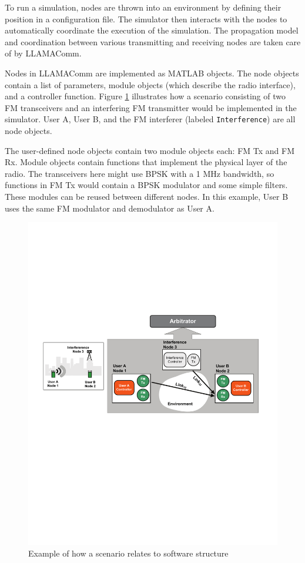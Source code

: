 To run a simulation, nodes are thrown into an environment by
defining their position in a configuration file.  The simulator then
interacts with the nodes to automatically coordinate the execution
of the simulation.  The propagation model and coordination between
various transmitting and receiving nodes are taken care of by
LLAMAComm.

Nodes in LLAMAComm are implemented as MATLAB objects.  The node
objects contain a list of parameters, module objects (which describe
the radio interface), and a controller function. Figure
\ref{fig:softwareOverview} illustrates how a scenario consisting of
two FM transceivers and an interfering FM transmitter would be
implemented in the simulator. User A, User B, and the FM interferer
(labeled \verb+Interference+) are all node objects.

The user-defined node objects contain two module objects each: FM Tx
and FM Rx.  Module objects contain functions that implement the
physical layer of the radio.  The transceivers here might use BPSK
with a 1 MHz bandwidth, so functions in FM Tx would contain a BPSK
modulator and some simple filters.  These modules can be reused
between different nodes.  In this example, User B uses the same FM
modulator and demodulator as User A.

\begin{figure}[h]
\centering
\includegraphics[width=6in]{"figs/Software Overview"}
\caption{Example of how a scenario relates to software structure}
\label{fig:softwareOverview}
\end{figure}

